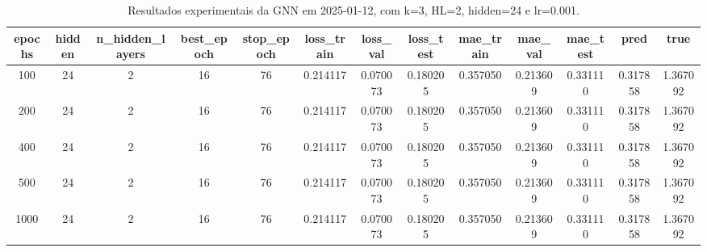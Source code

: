 \begin{table}[h]
\centering
\caption{Resultados experimentais da GNN em 2025-01-12, com k=3, HL=2, hidden=24 e lr=0.001.}
\label{tab:gnn_results_k3_hl2_h24_d20250112}
\begin{tabular}{ccccccccccccc}
\toprule
epochs & hidden & n\_hidden\_layers & best\_epoch & stop\_epoch & loss\_train & loss\_val & loss\_test & mae\_train & mae\_val & mae\_test & pred & true \\
\midrule
100 & 24 & 2 & 16 & 76 & 0.214117 & 0.070073 & 0.180205 & 0.357050 & 0.213609 & 0.331110 & 0.317858 & 1.367092 \\
200 & 24 & 2 & 16 & 76 & 0.214117 & 0.070073 & 0.180205 & 0.357050 & 0.213609 & 0.331110 & 0.317858 & 1.367092 \\
400 & 24 & 2 & 16 & 76 & 0.214117 & 0.070073 & 0.180205 & 0.357050 & 0.213609 & 0.331110 & 0.317858 & 1.367092 \\
500 & 24 & 2 & 16 & 76 & 0.214117 & 0.070073 & 0.180205 & 0.357050 & 0.213609 & 0.331110 & 0.317858 & 1.367092 \\
1000 & 24 & 2 & 16 & 76 & 0.214117 & 0.070073 & 0.180205 & 0.357050 & 0.213609 & 0.331110 & 0.317858 & 1.367092 \\
\bottomrule
\end{tabular}
\end{table}
